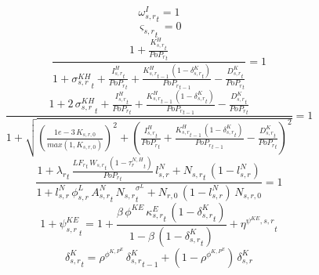 \noindent[name= `HH FOC investment 3 1']
\begin{dmath}
{{\omega^I_{s,r}}}_{t}=1
\end{dmath}
\noindent[name= `HH capital scrapping 3 1']
\begin{dmath}
{{\varsigma_{s,r}}}_{t}=0
\end{dmath}
\noindent[name= `LOM capital 3 1']
\begin{dmath}
\frac{1+\frac{{{K^H_{s,r}}}_{t}}{{{PoP_r}}_{t}}}{1+{{\sigma^{KH}_{s,r}}}_{t}+\frac{{{I^H_{s,r}}}_{t}}{{{PoP_r}}_{t}}+\frac{{{K^H_{s,r}}}_{t-1}\, \left(1-{{\delta^{K}_{s,r}}}_{t}\right)}{{{PoP_r}}_{t-1}}-\frac{{{D^K_{s,r}}}_{t}}{{{PoP_r}}_{t}}}=1
\end{dmath}
\noindent[name= `Capital non-negativity slack 3 1']
\begin{dmath}
\frac{1+2\, {{\sigma^{KH}_{s,r}}}_{t}+\frac{{{I^H_{s,r}}}_{t}}{{{PoP_r}}_{t}}+\frac{{{K^H_{s,r}}}_{t-1}\, \left(1-{{\delta^{K}_{s,r}}}_{t}\right)}{{{PoP_r}}_{t-1}}-\frac{{{D^K_{s,r}}}_{t}}{{{PoP_r}}_{t}}}{1+\sqrt{\left(\frac{1e-3\, {{K_{s,r,0}}}}{max(1,{{K_{s,r,0}}})}\right)^{2}+\left(\frac{{{I^H_{s,r}}}_{t}}{{{PoP_r}}_{t}}+\frac{{{K^H_{s,r}}}_{t-1}\, \left(1-{{\delta^{K}_{s,r}}}_{t}\right)}{{{PoP_r}}_{t-1}}-\frac{{{D^K_{s,r}}}_{t}}{{{PoP_r}}_{t}}\right)^{2}}}=1
\end{dmath}
\noindent[name= `FOC labour supply 3 1']
\begin{dmath}
\frac{1+{\lambda_r}_{t}\, \frac{{{LF_r}}_{t}\, {{W_{s,r}}}_{t}\, \left(1-{{\tau^{N,H}_{r}}}_{t}\right)}{{{PoP_r}}_{t}}\, {{l^{N}_{s,r}}}+{{N_{s,r}}}_{t}\, \left(1-{{l^{N}_{s,r}}}\right)}{1+{{l^{N}_{s,r}}}\, {{\phi^{L}_{s,r}}}\, {{A^{N}_{s,r}}}_{t}\, {{N_{s,r}}}_{t}^{{{\sigma^{L}}}}+{{N_{r,0}}}\, \left(1-{{l^{N}_{s,r}}}\right)\, {{N_{s,r,0}}}}=1
\end{dmath}
\noindent[name= `SRI capital rental wedge 3 1']
\begin{dmath}
1+{{\psi^{KE}_{s,r}}}_{t}=1+\frac{{{\beta}}\, {{\phi^{KE}}}\, {{\kappa^{E}_{s,r}}}_{t}\, \left(1-{{\delta^{K}_{s,r}}}_{t}\right)}{1-{{\beta}}\, \left(1-{{\delta^{K}_{s,r}}}_{t}\right)}+{{\eta^{\psi^{KE},s,r}}}_{t}
\end{dmath}
\noindent[name= `delta\_4\_1']
\begin{dmath}
{{\delta^{K}_{s,r}}}_{t}={{\rho^{\phi^{K,P^E}}}}\, {{\delta^{K}_{s,r}}}_{t-1}+\left(1-{{\rho^{\phi^{K,P^E}}}}\right)\, {{\delta^{K}_{s,r}}}
\end{dmath}
